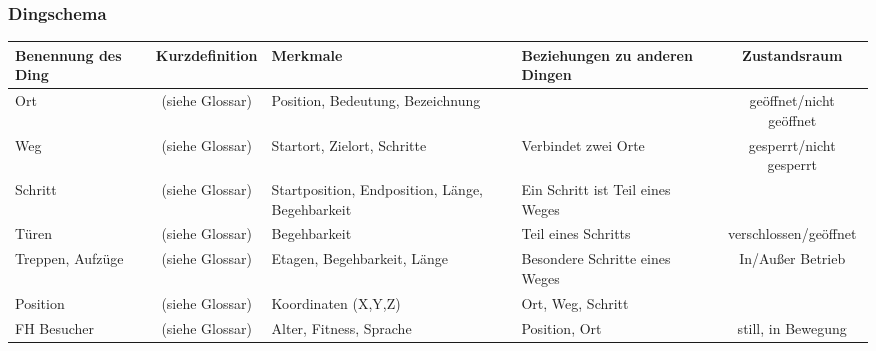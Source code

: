\subsubsection*{Dingschema}
\begin{center}
    \begin{tabular}{ | p{2.2cm} | c | p{2.8cm} | p{2.5cm} | c | }
    \hline
    \textbf{Benennung des Ding} & \textbf{Kurzdefinition} & \textbf{Merkmale} & \textbf{Beziehungen zu anderen Dingen} & \textbf{Zustandsraum} \\ \hline
    Ort & (siehe Glossar) & Position, Bedeutung, Bezeichnung & & geöffnet/nicht geöffnet \\ \hline
    Weg & (siehe Glossar) & Startort, Zielort, Schritte & Verbindet zwei Orte & gesperrt/nicht gesperrt\\ \hline 
    Schritt & (siehe Glossar) & Startposition, Endposition, Länge, Begehbarkeit & Ein Schritt ist Teil eines Weges &\\ \hline 
    Türen & (siehe Glossar) & Begehbarkeit & Teil eines Schritts & verschlossen/geöffnet\\ \hline 
    Treppen, Aufzüge & (siehe Glossar) & Etagen, Begehbarkeit, Länge & Besondere Schritte eines Weges & In/Außer Betrieb\\ \hline 
    Position & (siehe Glossar) & Koordinaten (X,Y,Z) & Ort, Weg, Schritt &\\ \hline 
    FH Besucher & (siehe Glossar) & Alter, Fitness, Sprache & Position, Ort & still, in Bewegung\\ \hline 
    \end{tabular}
\end{center}